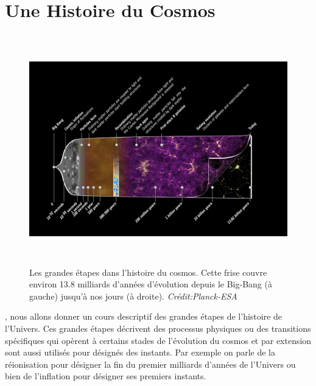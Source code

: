 \section{Une Histoire du Cosmos}
\begin{figure}[htbp]
	\centering
		\includegraphics[height=10cm]{figs/timeline.png}
		\caption[Les grandes étapes dans l'histoire du cosmos]{Les grandes étapes dans l'histoire du cosmos. Cette frise couvre environ 13.8 milliards d'années d'évolution depuis le Big-Bang (à gauche) jusqu'à nos jours (à droite). \textit{Crédit:Planck-ESA}}
	\label{f:timeline}
\end{figure}

, nous allons donner un cours descriptif des grandes étapes de l'histoire de l'Univers. Ces grandes étapes décrivent des processus physiques ou des transitions spécifiques qui opèrent à certains stades de l'évolution du cosmos et par extension sont aussi utilisés pour désignés des instants. Par exemple on parle de la réionisation pour désigner la fin du premier milliards d'années de l'Univers ou bien de l'inflation pour désigner ses premiers instants.

